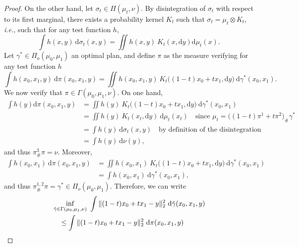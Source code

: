 \documentclass[twoside]{article}
\begin{document}
\begin{proof}
    On the other hand, let $\sigma_t \in \Pi(\mu_t,\nu)$. By disintegration of $\sigma_t$ with respect to its first marginal, there exists a probability kernel $K_t$ such that $\sigma_t = \mu_t \otimes K_t$, \emph{i.e.}, such that for any test function $h$, 
    \begin{equation}
        \int h(x,y)\ \mathrm{d}\sigma_t(x,y) =  \iint h(x,y)\ K_t(x,\mathrm{d}y)\mathrm{d}\mu_t(x).
    \end{equation}
    Let $\gamma^* \in \Pi_o(\mu_0,\mu_1)$ an optimal plan, and define $\pi$ as the measure verifying for any test function $h$
    \begin{equation}
        \int h(x_0,x_1,y)\ \mathrm{d}\pi(x_0,x_1,y) = \iint h(x_0,x_1,y)\ K_t\big((1-t)x_0+tx_1, \mathrm{d}y\big)\ \mathrm{d}\gamma^*(x_0, x_1).
    \end{equation}
    We now verify that $\pi\in\Gamma(\mu_0,\mu_1,\nu)$. On one hand,
    \begin{equation}
        \begin{aligned}
            \int h(y)\mathrm{d}\pi(x_0,x_1,y) &= \iint h(y)\ K_t\big((1-t)x_0 + tx_1, \mathrm{d}y\big)\ \mathrm{d}\gamma^*(x_0,x_1) \\
            &= \iint h(y)\ K_t(x_t, \mathrm{d}y)\ \mathrm{d}\mu_t(x_t) \quad \text{since $\mu_t = \big((1-t)\pi^1 + t\pi^2\big)_\#\gamma^*$} \\
            &= \int h(y)\ \mathrm{d}\sigma_t(x,y) \quad \text{by definition of the disintegration} \\
            &= \int h(y)\ \mathrm{d}\nu(y),
        \end{aligned}
    \end{equation}
    and thus $\pi^3_\#\pi=\nu$. Moreover,
    \begin{equation}
        \begin{aligned}
            \int h(x_0,x_1)\ \mathrm{d}\pi(x_0,x_1,y) &= \iint h(x_0,x_1)\ K_t\big((1-t)x_0+tx_1, \mathrm{d}y\big)\ \mathrm{d}\gamma^*(x_0,x_1) \\
            &= \int h(x_0,x_1)\ \mathrm{d}\gamma^*(x_0,x_1),
        \end{aligned}
    \end{equation}
    and thus $\pi^{1,2}_\#\pi=\gamma^*\in\Pi_o(\mu_0,\mu_1)$. Therefore, we can write
    \begin{equation}
        \begin{aligned}
            &\inf_{\Tilde{\gamma}\in\Gamma(\mu_0, \mu_1, \nu)}\ \int \|(1-t)x_0 +tx_1 - y\|_2^2\ \mathrm{d}\Tilde{\gamma}(x_0,x_1,y) \\ &\quad \le \int \|(1-t)x_0 + tx_1 - y\|_2^2\ \mathrm{d}\pi(x_0,x_1,y) \\

\end{aligned}
\end{equation}
\end{proof}
\end{document}
